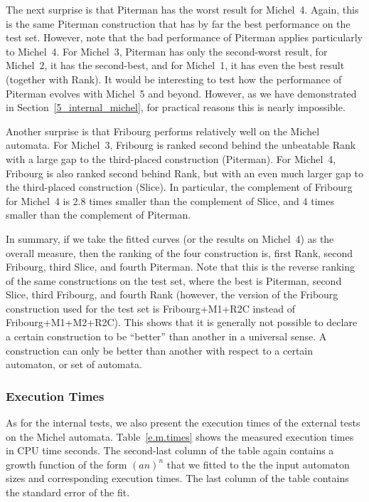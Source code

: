 The next surprise is that Piterman has the worst result for Michel~4. Again, this is the same Piterman construction that has by far the best performance on the \goal{} test set. However, note that the bad performance of Piterman applies particularly to Michel~4. For Michel~3, Piterman has only the second-worst result, for Michel~2, it has the second-best, and for Michel~1, it has even the best result (together with Rank). It would be interesting to test how the performance of Piterman evolves with Michel~5 and beyond. However, as we have demonstrated in Section~\ref{5_internal_michel}, for practical reasons this is nearly impossible.

Another surprise is that Fribourg performs relatively well on the Michel automata. For Michel~3, Fribourg is ranked second behind the unbeatable Rank with a large gap to the third-placed construction (Piterman). For Michel~4, Fribourg is also ranked second behind Rank, but with an even much larger gap to the third-placed construction (Slice). In particular, the complement of Fribourg for Michel~4 is 2.8 times smaller than the complement of Slice, and 4 times smaller than the complement of Piterman.

In summary, if we take the fitted curves (or the results on Michel~4) as the overall measure, then the ranking of the four construction is, first Rank, second Fribourg, third Slice, and fourth Piterman. Note that this is the reverse ranking of the same constructions on the \goal{} test set, where the best is Piterman, second Slice, third Fribourg, and fourth Rank (however, the version of the Fribourg construction used for the \goal{} test set is Fribourg+M1+R2C instead of Fribourg+M1+M2+R2C). This shows that it is generally not possible to declare a certain construction to be ``better'' than another in a universal sense. A construction can only be better than another with respect to a certain automaton, or set of automata.

\subsubsection{Execution Times}
As for the internal tests, we also present the execution times of the external tests on the Michel automata. Table~\ref{e.m.times} shows the measured execution times in CPU time seconds. The second-last column of the table again contains a growth function of the form $(an)^n$ that we fitted to the the input automaton sizes and corresponding execution times. The last column of the table contains the standard error of the fit.

